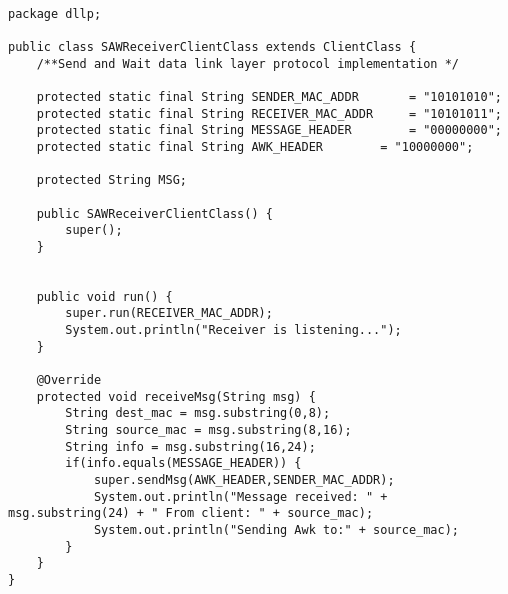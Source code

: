 \begin{verbatim}

package dllp;

public class SAWReceiverClientClass extends ClientClass {
	/**Send and Wait data link layer protocol implementation */
	
	protected static final String SENDER_MAC_ADDR 		= "10101010";
	protected static final String RECEIVER_MAC_ADDR 	= "10101011";
	protected static final String MESSAGE_HEADER 		= "00000000";
	protected static final String AWK_HEADER 		= "10000000";
	
	protected String MSG;

	public SAWReceiverClientClass() {
		super();
	}
	

	public void run() {
		super.run(RECEIVER_MAC_ADDR);
		System.out.println("Receiver is listening...");
	}

	@Override
	protected void receiveMsg(String msg) {
		String dest_mac = msg.substring(0,8);
		String source_mac = msg.substring(8,16);
		String info = msg.substring(16,24);
		if(info.equals(MESSAGE_HEADER)) {
			super.sendMsg(AWK_HEADER,SENDER_MAC_ADDR);
			System.out.println("Message received: " + msg.substring(24) + " From client: " + source_mac);
			System.out.println("Sending Awk to:" + source_mac);
		}
	}
}
\end{verbatim}
